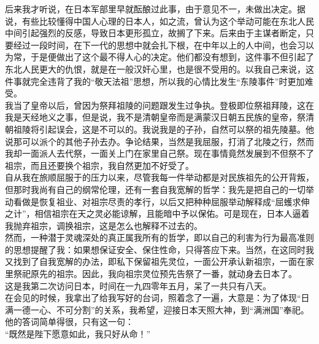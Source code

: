 后来我才听说，在日本军部里早就酝酿过此事，由于意见不一，未做出决定。据说，有些比较懂得中国人心理的日本人，如之流，曾认为这个举动可能在东北人民中间引起强烈的反感，导致日本更形孤立，故搁了下来。后来由于主谋者断定，只要经过一段时间，在下一代的思想中就会扎下根，在中年以上的人中间，也会习以为常，于是便做出了这个最不得人心的决定。他们都没有想到，这件事不但引起了东北人民更大的仇恨，就是在一般汉奸心里，也是很不受用的。以我自己来说，这件事就完全违背了我的“敬天法祖”思想，所以我的心情比发生“东陵事件”时更加难受。\\

我当了皇帝以后，曾因为祭拜祖陵的问题跟发生过争执。登极即位祭祖拜陵，这在我是天经地义之事，但是说，我不是清朝皇帝而是满蒙汉日朝五民族的皇帝，祭清朝祖陵将引起误会，这是不可以的。我说我是的子孙，自然可以祭的祖先陵墓。他说那可以派个的其他子孙去办。争论结果，当然是我屈服，打消了北陵之行，然而我却一面派人去代祭，一面关上门在家里自己祭。现在事情竟然发展到不但祭不了祖宗，而且还要换个祖宗，我自然更加不好受了。\\

自从我在旅顺屈服于的压力以来，尽管我每一件举动都是对民族祖先的公开背叛，但那时我尚有自己的纲常伦理，还有一套自我宽解的哲学：我先是把自己的一切举动看做是恢复祖业、对祖宗尽责的孝行，以后又把种种屈服举动解释成“屈蠖求伸之计”，相信祖宗在天之灵必能谅解，且能暗中予以保佑。可是现在，日本人逼着我抛弃祖宗，调换祖宗，这是怎么也解释不过去的。\\

然而，一种潜于灵魂深处的真正属我所有的哲学，即以自己的利害为行为最高准则的思想提醒了我：如果想保证安全、保住性命，只得答应下来。当然，在这同时我又找到了自我宽解的办法，即私下保留祖先灵位，一面公开承认新祖宗，一面在家里祭祀原先的祖宗。因此，我向祖宗灵位预先告祭了一番，就动身去日本了。\\

这是我第二次访问日本，时间在一九四零年五月，呆了一共只有八天。\\

在会见的时候，我拿出了给我写好的台词，照着念了一遍，大意是：为了体现“日满一德一心、不可分割”的关系，我希望，迎接日本天照大神，到“满洲国”奉祀。他的答词简单得很，只有这一句：\\

“既然是陛下愿意如此，我只好从命！”\\

